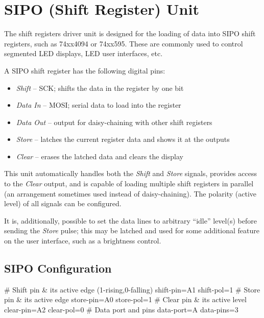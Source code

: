 \section{SIPO (Shift Register) Unit}

The shift registers driver unit is designed for the loading of data into \gls{SIPO} shift registers, such as 74xx4094 or 74xx595. These are commonly used to control segmented \gls{LED} displays, \gls{LED} user interfaces, etc.

\noindent
A SIPO shift register has the following digital pins:

\begin{itemize}[itemsep=0pt]
	\item \textit{Shift} -- \gls{SCK}; shifts the data in the register by one bit
	\item \textit{Data In} -- \gls{MOSI}; serial data to load into the register
	\item \textit{Data Out} -- output for daisy-chaining with other shift registers
	\item \textit{Store} -- latches the current register data and shows it at the outputs
	\item \textit{Clear} -- erases the latched data and clears the display
\end{itemize}

This unit automatically handles both the \textit{Shift} and \textit{Store} signals, provides access to the \textit{Clear} output, and is capable of loading multiple shift registers in parallel (an arrangement sometimes used instead of daisy-chaining). The polarity (active level) of all signals can be configured.

It is, additionally, possible to set the data lines to arbitrary ``idle'' level(s) before sending the \textit{Store} pulse; this may be latched and used for some additional feature on the user interface, such as a brightness control.


\subsection{SIPO Configuration}

\begin{inicode}
# Shift pin & its active edge (1-rising,0-falling)
shift-pin=A1
shift-pol=1
# Store pin & its active edge
store-pin=A0
store-pol=1
# Clear pin & its active level
clear-pin=A2
clear-pol=0
# Data port and pins
data-port=A
data-pins=3
\end{inicode}

